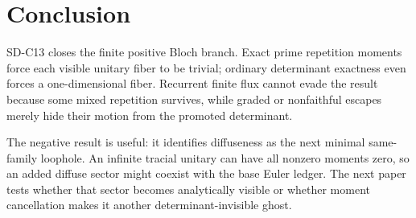 \section{Conclusion}

SD-C13 closes the finite positive Bloch branch.  Exact prime repetition
moments force each visible unitary fiber to be trivial; ordinary determinant
exactness even forces a one-dimensional fiber.  Recurrent finite flux cannot
evade the result because some mixed repetition survives, while graded or
nonfaithful escapes merely hide their motion from the promoted determinant.

The negative result is useful: it identifies diffuseness as the next minimal
same-family loophole.  An infinite tracial unitary can have all nonzero
moments zero, so an added diffuse sector might coexist with the base Euler
ledger.  The next paper tests whether that sector becomes analytically visible
or whether moment cancellation makes it another determinant-invisible ghost.
